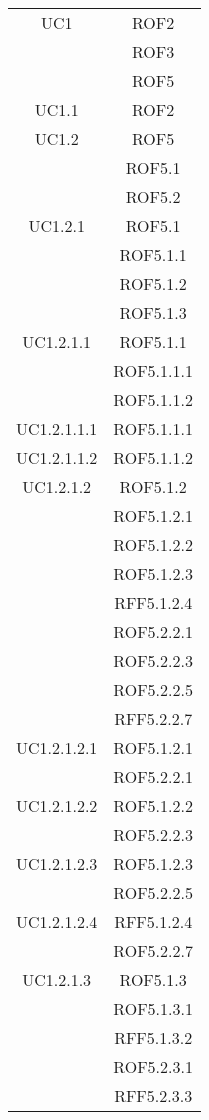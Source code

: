 \begin{longtable}{|c|c|}
\midrule
UC1
& ROF2\\
& ROF3\\
& ROF5\\

\midrule
UC1.1
& ROF2\\

\midrule
UC1.2
& ROF5\\
& ROF5.1\\
& ROF5.2\\

\midrule
UC1.2.1
& ROF5.1\\
& ROF5.1.1\\
& ROF5.1.2\\
& ROF5.1.3\\

\midrule
UC1.2.1.1
& ROF5.1.1\\
& ROF5.1.1.1\\
& ROF5.1.1.2\\

\midrule
UC1.2.1.1.1
& ROF5.1.1.1\\

\midrule
UC1.2.1.1.2
& ROF5.1.1.2\\

\midrule
UC1.2.1.2
& ROF5.1.2\\
& ROF5.1.2.1\\
& ROF5.1.2.2\\
& ROF5.1.2.3\\
& RFF5.1.2.4\\
& ROF5.2.2.1\\
& ROF5.2.2.3\\
& ROF5.2.2.5\\
& RFF5.2.2.7\\

\midrule
UC1.2.1.2.1
& ROF5.1.2.1\\
& ROF5.2.2.1\\

\midrule
UC1.2.1.2.2
& ROF5.1.2.2\\
& ROF5.2.2.3\\

\midrule
UC1.2.1.2.3
& ROF5.1.2.3\\
& ROF5.2.2.5\\

\midrule
UC1.2.1.2.4 
& RFF5.1.2.4\\
& ROF5.2.2.7\\

\midrule
UC1.2.1.3
& ROF5.1.3\\
& ROF5.1.3.1\\
& RFF5.1.3.2\\
& ROF5.2.3.1\\
& RFF5.2.3.3\\


\end{longtable}
